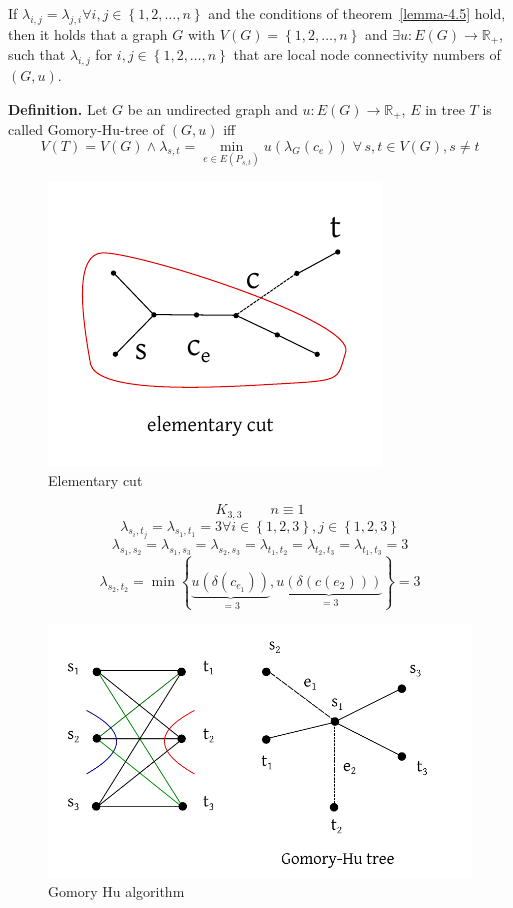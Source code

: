 \documentclass[a4paper]{article}
\theoremstyle{definition}
\newcommand{\set}[1]{\left\{#1\right\}}
\newcommand{\fall}{\;\forall\,}
\begin{document}
  If $\lambda_{i,j} = \lambda_{j,i} \forall i,j \in \set{1, 2, \ldots, n}$ and the conditions of theorem~\ref{lemma-4.5} hold, then it holds that a graph $G$ with $V(G) = \set{1, 2, \ldots, n}$ and $\exists u: E(G) \rightarrow \mathbb{R}_+$, such that $\lambda_{i,j}$ for $i,j \in \set{1, 2, \ldots, n}$ that are local node connectivity numbers of $(G, u)$.

\textbf{Definition.}
  Let $G$ be an undirected graph and $u: E(G) \rightarrow \mathbb{R}_+$, $E$ in tree $T$ is called Gomory-Hu-tree of $(G, u)$ iff
  \[
    V(T) = V(G) \land \lambda_{s,t} = \min_{e \in E(P_{s,t})} u(\lambda_G (c_e)) \fall s,t \in V(G), s \neq t
  \]

\begin{figure}[ht]
 \begin{center}
  \includegraphics{img/fundamental_cut.pdf}
  \caption{Elementary cut}
 \end{center}
\end{figure}

\[
  K_{3,3} \qquad n \equiv 1
\] \[
  \lambda_{s_i,t_j} = \lambda_{s_1, t_1} = 3 \forall i \in \set{1, 2, 3}, j \in \set{1, 2, 3}
\] \[
  \lambda_{s_1,s_2} = \lambda_{s_1,s_3} = \lambda_{s_2,s_3} = \lambda_{t_1,t_2}
    = \lambda_{t_2,t_3} = \lambda_{t_1,t_3} = 3
\] \[
  \lambda_{s_2, t_2} = \min\set{
    \underbrace{u(\delta(c_{e_1}))}_{=3},
    \underbrace{u(\delta(c(e_2)))}_{=3}
  } = 3
\]

\begin{figure}[ht]
 \begin{center}
  \includegraphics{img/gomory_hu.pdf}
  \caption{Gomory Hu algorithm}
 \end{center}
\end{figure}
\end{document}
